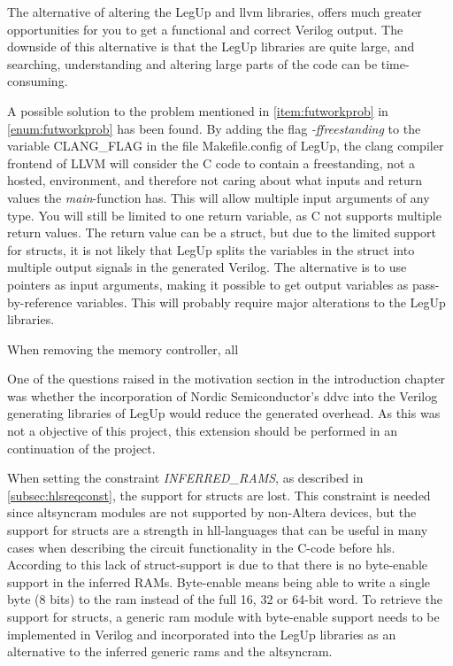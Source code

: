 The alternative of altering the LegUp and \gls{llvm} libraries, offers much greater opportunities for you to get a functional and correct Verilog output. The downside of this alternative is that the LegUp libraries are quite large, and searching, understanding and altering large parts of the code can be time-consuming. 

A possible solution to the problem mentioned in \cref{item:futworkprob} in \cref{enum:futworkprob} has been found. By adding the flag \textit{-ffreestanding} to the variable CLANG\_FLAG in the file Makefile.config of LegUp, the clang compiler frontend of LLVM will consider the C code to contain a freestanding, not a hosted, environment, and therefore not caring about what inputs and return values the \textit{main}-function has. This will allow multiple input arguments of any type. You will still be limited to one return variable, as C not supports multiple return values. The return value can be a struct, but due to the limited support for structs, it is not likely that LegUp splits the variables in the struct into multiple output signals in the generated Verilog. The alternative is to use pointers as input arguments, making it possible to get output variables as pass-by-reference variables. This will probably require major alterations to the LegUp libraries.   

When removing the memory controller, all 

One of the questions raised in the motivation section in the introduction chapter was whether the incorporation of Nordic Semiconductor's \gls{ddvc} into the Verilog generating libraries of LegUp would reduce the generated overhead. As this was not a objective of this project, this extension should be performed in an continuation of the project.

When setting the constraint \textit{INFERRED\_RAMS}, as described in \cref{subsec:hlsreqconst}, the support for structs are lost. This constraint is needed since altsyncram modules are not supported by non-Altera devices, but the support for structs are a strength in \gls{hll}-languages that can be useful in many cases when describing the circuit functionality in the C-code before \gls{hls}. According to \cite{legupconst} this lack of struct-support is due to that there is no byte-enable support in the inferred RAMs. Byte-enable means being able to write a single byte (8 bits) to the \gls{ram} instead of the full 16, 32 or 64-bit word. To retrieve the support for structs, a generic \gls{ram} module with byte-enable support needs to be implemented in Verilog and incorporated into the LegUp libraries as an alternative to the inferred generic \gls{ram}s and the altsyncram. 